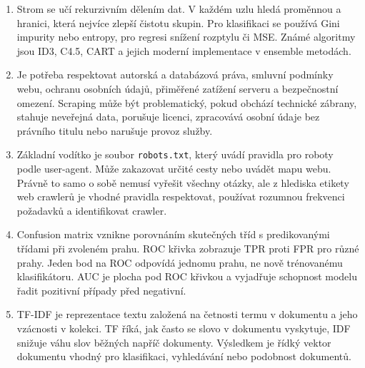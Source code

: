 \documentclass[12pt,a4paper]{article}
\begin{document}
\begin{enumerate}
  Nejprve definovat hypotézu, populaci příspěvků, období, zdroje a jednotku analýzy. Poté sesbírat
  data, vyčistit text, vytvořit nebo použít sentiment model a získat skóre sentimentu. Následně lze
  testovat podíl negativních příspěvků, porovnat jej s běžným obdobím nebo benchmarkem a vyhodnotit
  nejistotu. Dataset by měl obsahovat text, čas, zdroj, metadata, případně ruční label sentimentu pro
  validaci.

  \item {}

  Strom se učí rekurzivním dělením dat. V každém uzlu hledá proměnnou a hranici, která nejvíce zlepší
  čistotu skupin. Pro klasifikaci se používá Gini impurity nebo entropy, pro regresi snížení rozptylu
  či MSE. Známé algoritmy jsou ID3, C4.5, CART a jejich moderní implementace v ensemble metodách.

  \item {}

  Je potřeba respektovat autorská a databázová práva, smluvní podmínky webu, ochranu osobních údajů,
  přiměřené zatížení serveru a bezpečnostní omezení. Scraping může být problematický, pokud obchází
  technické zábrany, stahuje neveřejná data, porušuje licenci, zpracovává osobní údaje bez právního
  titulu nebo narušuje provoz služby.

  \item {}

  Základní vodítko je soubor \texttt{robots.txt}, který uvádí pravidla pro roboty podle user-agent.
  Může zakazovat určité cesty nebo uvádět mapu webu. Právně to samo o sobě nemusí vyřešit všechny
  otázky, ale z hlediska etikety web crawlerů je vhodné pravidla respektovat, používat rozumnou
  frekvenci požadavků a identifikovat crawler.

  \item {}

  Confusion matrix vznikne porovnáním skutečných tříd s predikovanými třídami při zvoleném prahu.
  ROC křivka zobrazuje TPR proti FPR pro různé prahy. Jeden bod na ROC odpovídá jednomu prahu, ne
  nově trénovanému klasifikátoru. AUC je plocha pod ROC křivkou a vyjadřuje schopnost modelu řadit
  pozitivní případy před negativní.

  \item {}

  TF-IDF je reprezentace textu založená na četnosti termu v dokumentu a jeho vzácnosti v kolekci.
  TF říká, jak často se slovo v dokumentu vyskytuje, IDF snižuje váhu slov běžných napříč dokumenty.
  Výsledkem je řídký vektor dokumentu vhodný pro klasifikaci, vyhledávání nebo podobnost dokumentů.
\end{enumerate}
\end{document}

